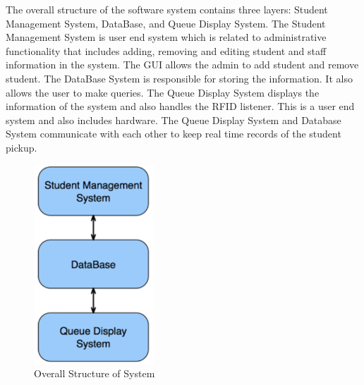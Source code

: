 	The overall structure of the software system contains three layers: Student Management System,
DataBase, and Queue Display System. The Student Management System is user end system which
is related to administrative functionality that includes adding, removing and editing student and staff
information in the system. The GUI allows the admin to add student and remove student. The DataBase
System is responsible for storing the information. It also allows the user to make queries. The Queue
Display System displays the information of the system and also handles the RFID listener. This is a user
end system and also includes hardware. The Queue Display System and Database System communicate
with each other to keep real time records of the student pickup.

\begin{figure}[h!]
	\centering
 	\includegraphics[width=0.40\textwidth]{./images/ads_1}
 \caption{Overall Structure of System}
\end{figure}
